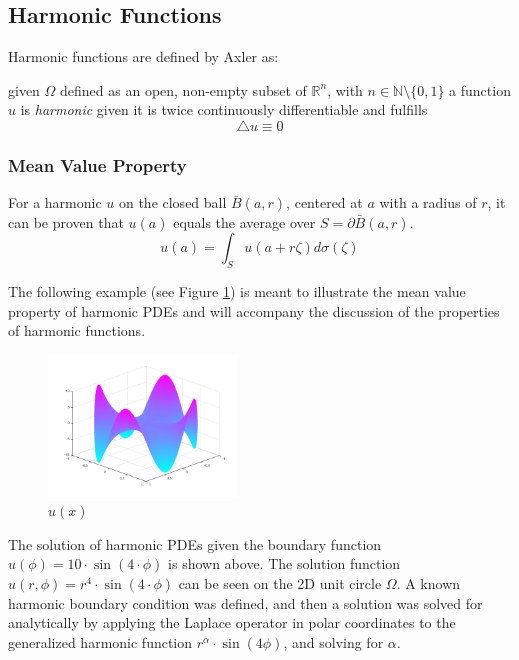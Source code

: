 \subsection{Harmonic Functions}\label{sssec:harmonics}
Harmonic functions are defined by Axler as:
\begin{definition} given $\Omega$ defined as an open, non-empty subset of
  $\mathbb{R}^{n}$, with $n \in \mathbb{N}\setminus \{0,1\}$
  a function $u$ is \textit{harmonic} given it is twice continuously differentiable
  and fulfills $$ \bigtriangleup u \equiv 0$$
\end{definition}


  \subsubsection{Mean Value Property}\label{sssec:meanvalue}
  For a harmonic $u$ on the closed ball $\bar{B}(a,r)$, centered at $a$ with a radius of $r$,
  it can be proven that $u(a)$ equals the average over $S = \partial \bar{B}(a,r)$\cite{Axler1992,Bornemann}.
\begin{equation}
  \tag{Mean Value Property}
  u(a) = \int_{S} u(a + r\zeta)d\sigma(\zeta)
  \label{eq:mean}
\end{equation}

The following example (see Figure \ref{fig:swingPlot}) is meant to illustrate
the mean value property of harmonic \Glspl{PDE} and will accompany the discussion
of the properties of harmonic functions.

\begin{figure}[ht]
  \centering
  \includegraphics[width=5cm]{styles/swing_function_plot.png}
  \caption{$u(x)$}%
  \label{fig:swingPlot}
\end{figure}

 The solution of harmonic \glspl{PDE} given the boundary
function $u(\phi)=10\cdot\sin(4\cdot\phi)$ is shown above. The solution function $u(r,\phi)=r^{4}\cdot\sin(4\cdot\phi)$
can be seen on the 2D unit circle $\Omega$.  A known harmonic boundary
condition was defined, and then a solution was solved for analytically by applying the Laplace operator
in polar coordinates to the generalized harmonic function $r^{\alpha}\cdot\sin(4\phi)$,
and solving for $\alpha$.

